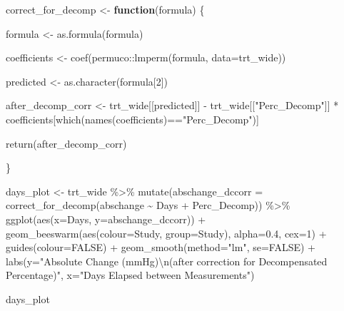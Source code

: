\documentclass[
]{article}
\newenvironment{Shaded}{\begin{snugshade}}{\end{snugshade}}
\newcommand{\AttributeTok}[1]{\textcolor[rgb]{0.77,0.63,0.00}{#1}}
\newcommand{\ConstantTok}[1]{\textcolor[rgb]{0.00,0.00,0.00}{#1}}
\newcommand{\ControlFlowTok}[1]{\textcolor[rgb]{0.13,0.29,0.53}{\textbf{#1}}}
\newcommand{\DecValTok}[1]{\textcolor[rgb]{0.00,0.00,0.81}{#1}}
\newcommand{\FloatTok}[1]{\textcolor[rgb]{0.00,0.00,0.81}{#1}}
\newcommand{\FunctionTok}[1]{\textcolor[rgb]{0.00,0.00,0.00}{#1}}
\newcommand{\NormalTok}[1]{#1}
\newcommand{\OtherTok}[1]{\textcolor[rgb]{0.56,0.35,0.01}{#1}}
\newcommand{\SpecialCharTok}[1]{\textcolor[rgb]{0.00,0.00,0.00}{#1}}
\newcommand{\StringTok}[1]{\textcolor[rgb]{0.31,0.60,0.02}{#1}}
\begin{document}
\begin{Shaded}
\begin{Highlighting}[]
\NormalTok{correct\_for\_decomp }\OtherTok{\textless{}{-}} \ControlFlowTok{function}\NormalTok{(formula) \{}
  
\NormalTok{  formula }\OtherTok{\textless{}{-}} \FunctionTok{as.formula}\NormalTok{(formula)}
  
\NormalTok{  coefficients }\OtherTok{\textless{}{-}} \FunctionTok{coef}\NormalTok{(permuco}\SpecialCharTok{::}\FunctionTok{lmperm}\NormalTok{(formula, }
                                       \AttributeTok{data=}\NormalTok{trt\_wide))}

\NormalTok{  predicted }\OtherTok{\textless{}{-}} \FunctionTok{as.character}\NormalTok{(formula[}\DecValTok{2}\NormalTok{])}
  
\NormalTok{  after\_decomp\_corr }\OtherTok{\textless{}{-}}\NormalTok{ trt\_wide[[predicted]] }\SpecialCharTok{{-}} 
\NormalTok{    trt\_wide[[}\StringTok{"Perc\_Decomp"}\NormalTok{]] }\SpecialCharTok{*}\NormalTok{ coefficients[}\FunctionTok{which}\NormalTok{(}\FunctionTok{names}\NormalTok{(coefficients)}\SpecialCharTok{==}\StringTok{"Perc\_Decomp"}\NormalTok{)]}
  
  \FunctionTok{return}\NormalTok{(after\_decomp\_corr)}
  
\NormalTok{\}}

\NormalTok{days\_plot }\OtherTok{\textless{}{-}}\NormalTok{ trt\_wide }\SpecialCharTok{\%\textgreater{}\%} 
  \FunctionTok{mutate}\NormalTok{(}\AttributeTok{abschange\_dccorr =} \FunctionTok{correct\_for\_decomp}\NormalTok{(abschange }\SpecialCharTok{\textasciitilde{}}\NormalTok{ Days }\SpecialCharTok{+}\NormalTok{ Perc\_Decomp)) }\SpecialCharTok{\%\textgreater{}\%} 
  \FunctionTok{ggplot}\NormalTok{(}\FunctionTok{aes}\NormalTok{(}\AttributeTok{x=}\NormalTok{Days, }\AttributeTok{y=}\NormalTok{abschange\_dccorr)) }\SpecialCharTok{+}
  \FunctionTok{geom\_beeswarm}\NormalTok{(}\FunctionTok{aes}\NormalTok{(}\AttributeTok{colour=}\NormalTok{Study, }\AttributeTok{group=}\NormalTok{Study), }\AttributeTok{alpha=}\FloatTok{0.4}\NormalTok{, }\AttributeTok{cex=}\DecValTok{1}\NormalTok{) }\SpecialCharTok{+}
  \FunctionTok{guides}\NormalTok{(}\AttributeTok{colour=}\ConstantTok{FALSE}\NormalTok{) }\SpecialCharTok{+} 
  \FunctionTok{geom\_smooth}\NormalTok{(}\AttributeTok{method=}\StringTok{"lm"}\NormalTok{, }\AttributeTok{se=}\ConstantTok{FALSE}\NormalTok{) }\SpecialCharTok{+}
  \FunctionTok{labs}\NormalTok{(}\AttributeTok{y=}\StringTok{"Absolute Change (mmHg)}\SpecialCharTok{\textbackslash{}n}\StringTok{(after correction for Decompensated Percentage)"}\NormalTok{,}
       \AttributeTok{x=}\StringTok{"Days Elapsed between Measurements"}\NormalTok{)}

\NormalTok{days\_plot}
\end{Highlighting}
\end{Shaded}
\end{document}
